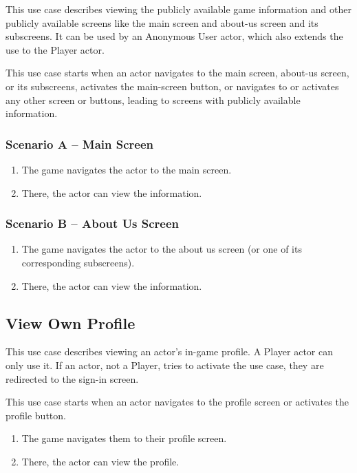 This use case describes viewing the publicly available game information and other publicly available screens like the main screen and about-us screen and its subscreens.
It can be used by an Anonymous User actor, which also extends the use to the Player actor.

This use case starts when an actor navigates to the main screen, about-us screen, or its subscreens, activates the main-screen button, or navigates to or activates any other screen or buttons, leading to screens with publicly available information.

\subsubsection*{Scenario A -- Main Screen}

\begin{enumerate}
    \item The game navigates the actor to the main screen.
    \item There, the actor can view the information.
\end{enumerate}

\subsubsection*{Scenario B -- About Us Screen}

\begin{enumerate}
    \item The game navigates the actor to the about us screen (or one of its corresponding subscreens).
    \item There, the actor can view the information.
\end{enumerate}

\subsection{View Own Profile}

This use case describes viewing an actor's in-game profile.
A Player actor can only use it.
If an actor, not a Player, tries to activate the use case, they are redirected to the sign-in screen.

This use case starts when an actor navigates to the profile screen or activates the profile button.

\begin{enumerate}
    \item The game navigates them to their profile screen.
    \item There, the actor can view the profile.
\end{enumerate}


